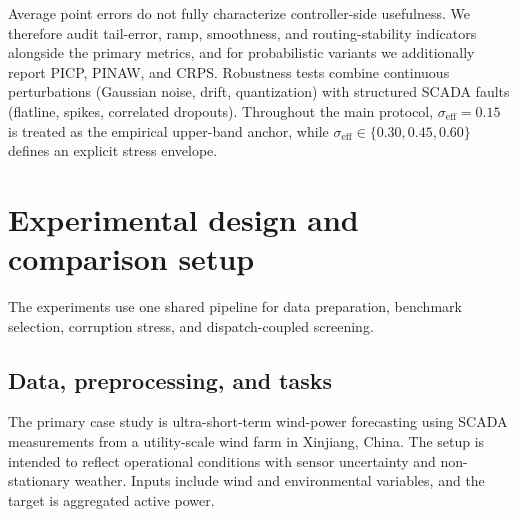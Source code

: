 ﻿\documentclass[review,1p,times]{elsarticle}
\begin{document}
Average point errors do not fully characterize controller-side usefulness. We therefore audit tail-error, ramp, smoothness, and routing-stability indicators alongside the primary metrics, and for probabilistic variants we additionally report PICP, PINAW, and CRPS. Robustness tests combine continuous perturbations (Gaussian noise, drift, quantization) with structured SCADA faults (flatline, spikes, correlated dropouts). Throughout the main protocol, $\sigma_{\mathrm{eff}}=0.15$ is treated as the empirical upper-band anchor, while $\sigma_{\mathrm{eff}}\in\{0.30,0.45,0.60\}$ defines an explicit stress envelope.


\section{Experimental design and comparison setup}
\label{sec:design}

The experiments use one shared pipeline for data preparation, benchmark selection, corruption stress, and dispatch-coupled screening.

\subsection{Data, preprocessing, and tasks}

The primary case study is ultra-short-term wind-power forecasting using SCADA measurements from a utility-scale wind farm in Xinjiang, China. The setup is intended to reflect operational conditions with sensor uncertainty and non-stationary weather. Inputs include wind and environmental variables, and the target is aggregated active power.
\end{document}
